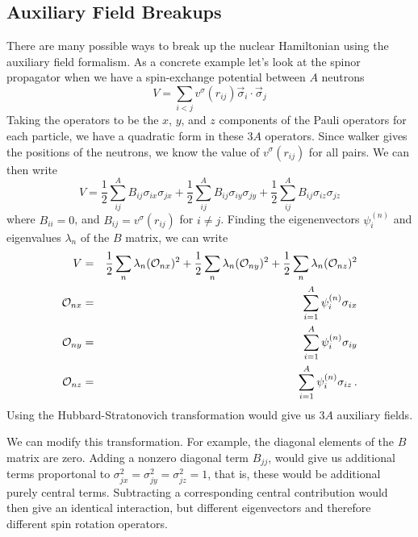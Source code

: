 \subsection{Auxiliary Field Breakups}
There are many possible ways to break up the nuclear Hamiltonian using
the auxiliary field formalism. As a concrete example let's look at
the spinor propagator when we have a spin-exchange potential between $A$
neutrons
\begin{equation}
V = \sum_{i<j}  v^{\sigma}(r_{ij}) \vec \sigma_i \cdot \vec \sigma_j
\end{equation}
Taking the operators to be the $x$, $y$, and $z$ components of the
Pauli operators for each particle, we have a quadratic form in these
$3A$ operators. Since walker gives the positions of the neutrons, we know
the value of $v^{\sigma}(r_{ij})$ for all pairs. We can then write
\begin{equation}
V = 
\frac{1}{2} \sum_{ij}^A B_{ij}\sigma_{ix}\sigma_{jx}
+\frac{1}{2} \sum_{ij}^A B_{ij}\sigma_{iy}\sigma_{jy}
+\frac{1}{2} \sum_{ij}^A B_{ij}\sigma_{iz}\sigma_{jz}
\end{equation}
where $B_{ii} = 0$, and $B_{ij} = v^{\sigma}(r_{ij})$ for  $i \neq j$.
Finding the eigenenvectors $\psi^{(n)}_i$ and eigenvalues $\lambda_n$
of the $B$ matrix, we
can write
\begin{eqnarray}
V &=&
\frac{1}{2} \sum_n \lambda_n ({\cal O}_{nx})^2
+\frac{1}{2} \sum_n \lambda_n ({\cal O}_{ny})^2
+\frac{1}{2} \sum_n \lambda_n ({\cal O}_{nz})^2
\nonumber\\
{\cal O}_{nx} &=& \sum_{i=1}^A \psi^{(n)}_i \sigma_{ix}
\nonumber\\
{\cal O}_{ny} &=& \sum_{i=1}^A \psi^{(n)}_i \sigma_{iy}
\nonumber\\
{\cal O}_{nz} &=& \sum_{i=1}^A \psi^{(n)}_i \sigma_{iz} \,.
\end{eqnarray}
Using the Hubbard-Stratonovich transformation would give us $3A$ auxiliary
fields.

We can modify this transformation. For example, the diagonal
elements of the $B$ matrix are zero. Adding a nonzero diagonal term $B_{jj}$,
would give us additional terms proportonal to
$\sigma_{jx}^2 =\sigma_{jy}^2 =\sigma_{jz}^2 = 1$, that is,
these would be additional purely central terms. Subtracting a corresponding
central contribution would then give an identical interaction, but
different eigenvectors and therefore different spin rotation operators.


